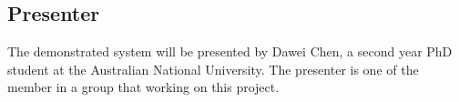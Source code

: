 \subsection{Presenter}
\label{ssec:presenter}
The demonstrated system will be presented by Dawei Chen, a second year PhD student at the Australian National University.
The presenter is one of the member in a group that working on this project.
